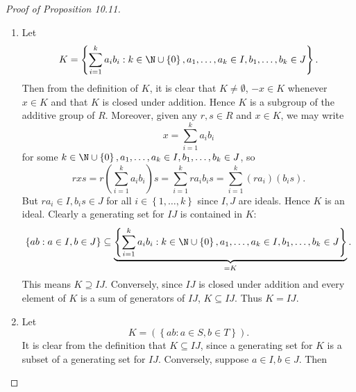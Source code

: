 \documentclass[pmath347]{subfiles}
\begin{document}
    \clearpage
    \begin{proof}[Proof of Proposition 10.11]
        \begin{enumerate}
            \item Let
                \begin{equation*}
                    K = \left\lbrace \sum^{k}_{i=1} a_ib_i:k\in\N\cup\left\lbrace 0 \right\rbrace , a_1,\ldots,a_k\in I, b_1,\ldots,b_k\in J \right\rbrace .
                \end{equation*}
                Then from the definition of $K$, it is clear that $K\neq\emptyset$, $-x\in K$ whenever $x\in K$ and that $K$ is closed under addition. Hence $K$ is a subgroup of the additive group of $R$. Moreover, given any $r,s\in R$ and $x\in K$, we may write
                \begin{equation*}
                    x = \sum^{k}_{i=1} a_ib_i
                \end{equation*}
                for some $k\in\N\cup\left\lbrace 0 \right\rbrace, a_1,\ldots,a_k\in I, b_1,\ldots,b_k\in J$, so
                \begin{equation*}
                    rxs = r\left( \sum^{k}_{i=1} a_ib_i \right) s = \sum^{k}_{i=1} ra_ib_is = \sum^{k}_{i=1} \left( ra_i \right) \left( b_is \right).
                \end{equation*}
                But $ra_i\in I, b_is\in J$ for all $i\in\left\lbrace 1,\ldots,k \right\rbrace$ since $I,J$ are ideals. Hence $K$ is an ideal. Clearly a generating set for $IJ$ is contained in $K$:
                \begin{equation*}
                    \left\lbrace ab: a\in I, b\in J \right\rbrace \subseteq \underbrace{\left\lbrace \sum^{k}_{i=1} a_ib_i:k\in\N\cup\left\lbrace 0 \right\rbrace , a_1,\ldots,a_k\in I, b_1,\ldots,b_k\in J \right\rbrace }_{=K}.
                \end{equation*}
                This means $K\supseteq IJ$. Conversely, since $IJ$ is closed under addition and every element of $K$ is a sum of generators of $IJ$, $K\subseteq IJ$. Thus $K=IJ$.
            \item Let
                \begin{equation*}
                    K = \left( \left\lbrace ab: a\in S, b\in T \right\rbrace  \right) .
                \end{equation*}
                It is clear from the definition that $K\subseteq IJ$, since a generating set for $K$ is a subset of a generating set for $IJ$. Conversely, suppose $a\in I, b\in J$. Then

\end{enumerate}
\end{proof}
\end{document}
